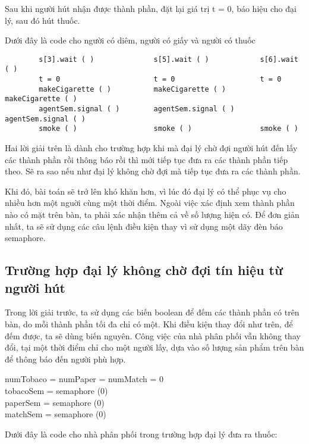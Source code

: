 \documentclass[a4paper]{article}
\begin{document}
	Sau khi người hút nhận được thành phần, đặt lại giá trị t = 0, báo hiệu cho đại lý, sau đó hút thuốc.

	Dưới đây là code cho người có diêm, người có giấy và người có thuốc
	\begin{tcolorbox}
		\begin{verbatim}
		s[3].wait ( )              s[5].wait ( )            s[6].wait ( )
		t = 0                      t = 0                    t = 0
		makeCigarette ( )          makeCigarette ( )        makeCigarette ( )
		agentSem.signal ( )        agentSem.signal ( )      agentSem.signal ( )
		smoke ( )                  smoke ( )                smoke ( )       
		\end{verbatim}
	\end{tcolorbox}
	
	
	
	Hai lời giải trên là dành cho trường hợp khi mà đại lý chờ đợi người hút đến lấy các thành phần rồi thông báo rồi
	thì mới tiếp tục đưa ra các thành phần tiếp theo. Sẽ ra sao nếu như đại lý không chờ đợi mà tiếp tục đưa 
	ra các thành phần. 

	Khi đó, bài toán sẽ trở lên khó khăn hơn, vì lúc đó đại lý có thể phục vụ cho nhiều hơn một nguời cùng một
	thời điểm. Ngoài việc xác định xem thành phần nào có mặt trên bàn, ta phải xác nhận thêm cả về số
	lượng hiện có. Để đơn giản nhất, ta sẽ sử dụng các câu lệnh điều kiện thay vì sử dụng một dãy đèn báo semaphore. 

	\subsection{Trường hợp đại lý không chờ đợi tín hiệu từ người hút}

	Trong lời giải trước, ta sử dụng các biến boolean để đếm các thành phần có trên bàn, do mỗi thành phần
	tối đa chỉ có một. Khi điều kiện thay đổi như trên, để đếm được, ta sẽ dùng biến nguyên. Công việc của 
	nhà phân phối vẫn không thay đổi, tại một thời điểm chỉ cho một người lấy, dựa vào số lượng sản phẩm 
	trên bàn để thông báo đến người phù hợp.

	\begin{tcolorbox}
	numTobaco = numPaper = numMatch = 0 \\
	tobacoSem = semaphore (0) \\
	paperSem = semaphore (0) \\
	matchSem = semaphore (0)
	\end{tcolorbox}

	Dưới đây là code cho nhà phân phối trong trường hợp đại lý đưa ra thuốc:
\end{document}
